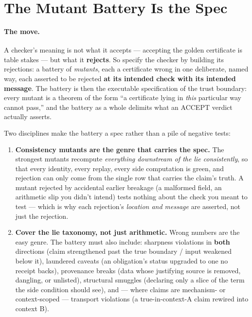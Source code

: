 \section{The Mutant Battery Is the Spec}
\label{sec:ckbk-mutant-battery}

\paragraph{The move.} A checker's meaning is not what it accepts ---
accepting the golden certificate is table stakes --- but what it
\textbf{rejects}. So specify the checker by building its rejections: a
battery of \emph{mutants}, each a certificate wrong in one deliberate,
named way, each asserted to be rejected \textbf{at its intended check
with its intended message}. The battery is then the executable
specification of the trust boundary: every mutant is a theorem of the
form ``a certificate lying in \emph{this} particular way cannot pass,''
and the battery as a whole delimits what an ACCEPT verdict actually
asserts.

Two disciplines make the battery a spec rather than a pile of negative
tests:

\begin{enumerate}
\item \textbf{Consistency mutants are the genre that carries the
  spec.} The strongest mutants recompute \emph{everything downstream
  of the lie consistently}, so that every identity, every replay, every side
  computation is green, and rejection can only come from the single row
  that carries the claim's truth. A mutant rejected by accidental
  earlier breakage (a malformed field, an arithmetic slip you didn't
  intend) tests nothing about the check you meant to test --- which is
  why each rejection's \emph{location and message} are asserted, not
  just the rejection.
\item \textbf{Cover the lie taxonomy, not just arithmetic.} Wrong
  numbers are the easy genre. The battery must also include: sharpness
  violations in \textbf{both} directions (claim strengthened past the
  true boundary / input weakened below it), laundered caveats (an
  obligation's status upgraded to one no receipt backs), provenance
  breaks (data whose justifying source is removed, dangling, or
  unlisted), structural smuggles (declaring only a slice of the term
  the side condition should see), and --- where claims are mechanism-
  or context-scoped --- transport violations (a true-in-context-A claim
  rewired into context B).
\end{enumerate}

